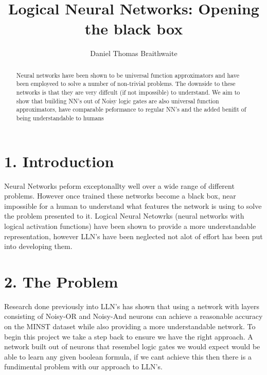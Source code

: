 \documentclass[11pt, a4paper, twoside, openright]{report}
\title{Logical Neural Networks: Opening the black box}
\author{Daniel Thomas Braithwaite}
\date{}
\begin{document}
\frontmatter


\begin{abstract}
Neural networks have been shown to be universal function approximators  and have been employeed to solve a number of non-trivial problems. The downside to these networks is that they are very diffcult (if not impossible) to understand. We aim to show that building NN's out of Noisy logic gates are also universal function approximators, have comparable peformance to regular NN's and the added benifit of being understandable to humans
\end{abstract}


\maketitle




\mainmatter


\section*{1. Introduction}

Neural Networks peform exceptonallty well over a wide range of different problems. However once trained these networks become a black box, near impossible for a human to understand what features the network is using to solve the problem presented to it. Logical Neural Netowrks (neural networks with logical activation functions) have been shown to provide a more understandable representation, however LLN's have been neglected not alot of effort has been put into developing them.

\section*{2. The Problem}

Research done previously into LLN's has shown that using a network with layers consisting of Noisy-OR and Noisy-And neurons can achieve a reasonable accuracy on the MINST dataset while also providing a more understandable network. To begin this project we take a step back to ensure we have the right approach. A network built out of neurons that resembel logic gates we would expect would be able to learn any given boolean formula, if we cant achieve this then there is a fundimental problem with our approach to LLN's.\\
\end{document}
